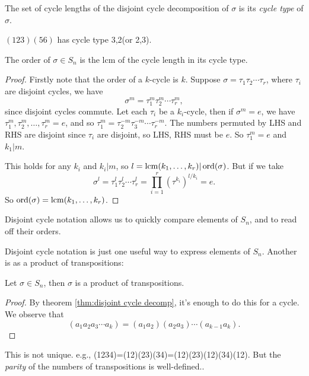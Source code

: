 \documentclass[a4paper]{article}
\begin{document}
\begin{definition}
  The set of cycle lengths of the disjoint cycle decomposition of $
  \sigma $ is its \textit{cycle type} of $\sigma$.
\end{definition}
\begin{example}
  $ (123)(56) $ has cycle type 3,2(or 2,3).
\end{example}
\begin{theorem}\label{thm:lcm of cycle type is order}
  The order of $ \sigma\in S_n $ is the lcm of the cycle length in
  its cycle type.
\end{theorem}
\begin{proof}
  Firstly note that the order of a $k$-cycle is $k$. Suppose $
  \sigma= \tau_1 \tau_2\cdots \tau_r $, where $ \tau_i $ are disjoint
  cycles, we have
  \[
    \sigma^m = \tau^m_1 \tau^m_2\cdots \tau^m_r
  ,\]
  since disjoint cycles commute. Let each $ \tau_i $ be a
  $k_i$-cycle, then if $ \sigma^m=e $, we have $
  \tau^m_1,\tau^m_2,\dots,\tau^m_r=e $, and so $
  \tau_1^m=\tau_2^{-m}\tau_{3}^{-m}\cdots \tau_{r}^{-m} $. The
  numbers permuted by LHS and RHS are disjoint since $ \tau_i $ are
  disjoint, so LHS, RHS must be $e$. So $ \tau_1^m=e $ and $ k_1|m$.

  This holds for any $k_i$ and $k_i|m$, so $ l=\operatorname{lcm} (k_1,\dots,k_r)|
  \operatorname{ord}(\sigma) $. But if we take
  \[
    \sigma^{l}=\tau^l_1 \tau^l_2\cdots \tau^l_r = \prod_{i=1}^r
    (\tau^{k_i})^{l/k_i}=e
  .\]
  So $ \operatorname{ord}(\sigma)=\operatorname{lcm} (k_1,\dots,k_r) $.
\end{proof}
\begin{remark}
  Disjoint cycle notation allows us to quickly compare elements of
  $S_n$, and to read off their orders.
\end{remark}
Disjoint cycle notation is just one useful way to express elements of
$S_n$. Another is as a product of transpositions:
\begin{proposition}\label{prop:2.16}
  Let $ \sigma\in S_n $, then $\sigma$ is a product of transpositions.
\end{proposition}
\begin{proof}
  By theorem \ref{thm:disjoint cycle decomp}, it's enough to do this
  for a cycle. We observe that
  \[
    (a_1 a_2 a_3 \cdots a_k)=(a_1a_2)(a_2a_3)\cdots(a_{k-1}a_k)
  .\]
\end{proof}
\begin{remark}
  This is not unique. e.g., (1234)=(12)(23)(34)=(12)(23)(12)(34)(12).
  But the \textit{parity} of the numbers of transpositions is well-defined..
\end{remark}
\end{document}
